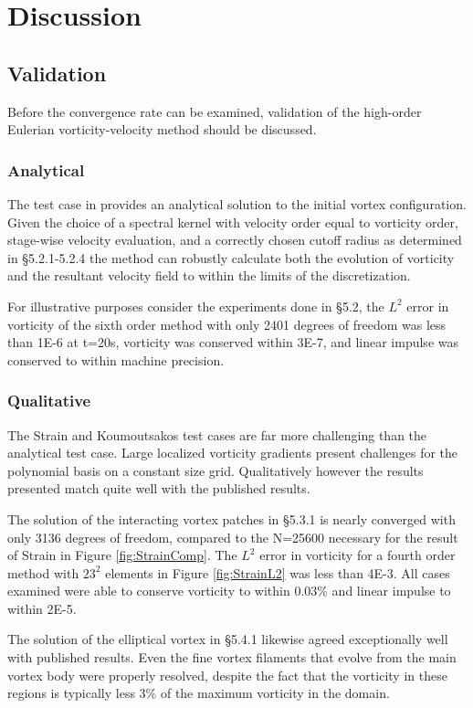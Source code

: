 \documentclass[letterpaper,12pt]{report}
\begin{document}
\chapter{Discussion}
\section{Validation}
Before the convergence rate can be examined, validation of the high-order Eulerian vorticity-velocity method should be discussed.
\subsection{Analytical}
The test case in \cite{Perlmann1985} provides an analytical solution to the initial vortex configuration. Given the choice of a spectral kernel with velocity order equal to vorticity order, stage-wise velocity evaluation, and a correctly chosen cutoff radius as determined in \S5.2.1-5.2.4 the method can robustly calculate both the evolution of vorticity and the resultant velocity field to within the limits of the discretization. 

For illustrative purposes consider the experiments done in \S5.2, the $L^2$ error in vorticity of the sixth order method with only 2401 degrees of freedom was less than 1E-6 at t=20s, vorticity was conserved within 3E-7, and linear impulse was conserved to within machine precision.
\subsection{Qualitative}
The Strain \cite{Strain1996} and Koumoutsakos \cite{Koum1997} test cases are far more challenging than the analytical test case. Large localized vorticity gradients present challenges for the polynomial basis on a constant size grid. Qualitatively however the results presented match quite well with the published results.

The solution of the interacting vortex patches in \S5.3.1 is nearly converged with only 3136 degrees of freedom, compared to the N=25600 necessary for the result of Strain in Figure \ref{fig:StrainComp}. The $L^2$ error in vorticity for a fourth order method with $23^2$ elements in Figure \ref{fig:StrainL2} was less than 4E-3. All cases examined were able to conserve vorticity to within 0.03\% and linear impulse to within 2E-5.

The solution of the elliptical vortex in \S5.4.1 likewise agreed exceptionally well with published results. Even the fine vortex filaments that evolve from the main vortex body were properly resolved, despite the fact that the vorticity in these regions is typically less 3\% of the maximum vorticity in the domain. 
\end{document}
